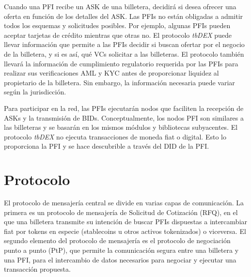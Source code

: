 \documentclass[11pt]{article}
\begin{document}
\vspace{1\baselineskip}
Cuando una PFI recibe un ASK de una billetera, decidirá si desea ofrecer una oferta en función de los detalles del ASK. Las PFIs no están obligadas a admitir todos los esquemas y solicitudes posibles. Por ejemplo, algunas PFIs pueden aceptar tarjetas de crédito mientras que otras no. El protocolo \textit{tbDEX} puede llevar información que permite a las PFIs decidir si buscan ofertar por el negocio de la billetera, y si es así, qué VCs solicitar a las billeteras. El protocolo también llevará la información de cumplimiento regulatorio requerida por las PFIs para realizar sus verificaciones AML y KYC antes de proporcionar liquidez al propietario de la billetera. Sin embargo, la información necesaria puede variar según la jurisdicción.

\vspace{1\baselineskip}
Para participar en la red, las PFIs ejecutarán nodos que faciliten la recepción de ASKs y la transmisión de BIDs. Conceptualmente, los nodos PFI son similares a las billeteras y se basarán en los mismos módulos y bibliotecas subyacentes. El protocolo \textit{tbDEX} no ejecuta transacciones de moneda fiat o digital. Esto lo proporciona la PFI y se hace descubrible a través del DID de la PFI.

\vspace{1\baselineskip}
\section{Protocolo}

\vspace{1\baselineskip}
El protocolo de mensajería central se divide en varias capas de comunicación. La primera es un protocolo de mensajería de Solicitud de Cotización (RFQ), en el que una billetera transmite su intención de buscar PFIs dispuestas a intercambiar fiat por tokens en especie (stablecoins u otros activos tokenizados) o viceversa. El segundo elemento del protocolo de mensajería es el protocolo de negociación punto a punto (PtP), que permite la comunicación segura entre una billetera y una PFI, para el intercambio de datos necesarios para negociar y ejecutar una transacción propuesta.
\end{document}
